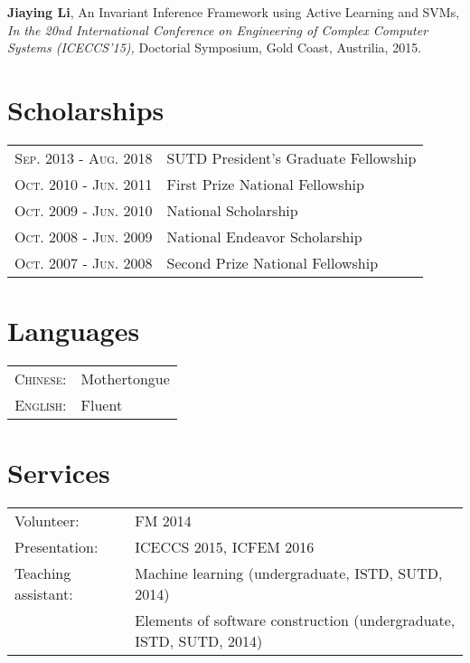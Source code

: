 \documentclass[a4paper,10pt]{article}
\begin{document}
\textbf{Jiaying Li}, An Invariant Inference Framework using Active Learning and SVMs, {\sl In the 20nd International Conference on Engineering of Complex Computer Systems (ICECCS'15),} Doctorial Symposium, Gold Coast, Austrilia, 2015.




\section{Scholarships}
\begin{tabular}{rl}
\textsc{Sep.} 2013 - \textsc{Aug.} 2018 & SUTD President’s Graduate Fellowship \\
\textsc{Oct.} 2010 - \textsc{Jun.} 2011 & First Prize National Fellowship \\
\textsc{Oct.} 2009 - \textsc{Jun.} 2010 & National Scholarship \\
\textsc{Oct.} 2008 - \textsc{Jun.} 2009 & National Endeavor Scholarship \\
\textsc{Oct.} 2007 - \textsc{Jun.} 2008 & Second Prize National Fellowship \\
\end{tabular}



\section{Languages}
\begin{tabular}{rl}
	\textsc{Chinese:}&Mothertongue\\
	\textsc{English:}&Fluent\\
\end{tabular}



\section{Services}
\begin{tabular}{ll}
Volunteer:&FM 2014\\
Presentation: &ICECCS 2015, ICFEM 2016\\
Teaching assistant:&Machine learning (undergraduate, ISTD, SUTD, 2014)\\
&Elements of software construction (undergraduate, ISTD, SUTD, 2014)
\end{tabular}
\end{document}
